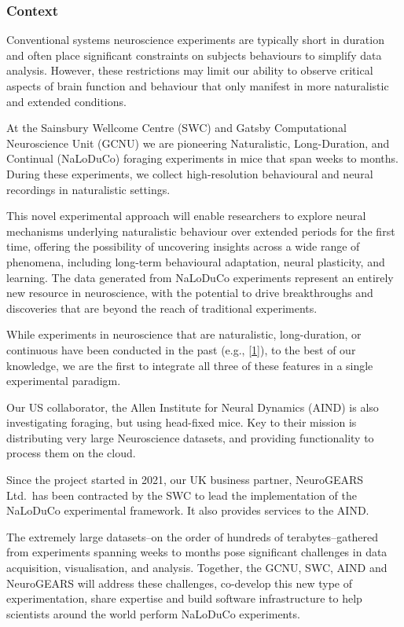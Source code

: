 \subsubsection{Context}

Conventional systems neuroscience experiments are typically short in duration
and often place significant constraints on subjects behaviours to simplify data
analysis.
%
However, these restrictions may limit our ability to observe critical
aspects of brain function and behaviour that only manifest in more naturalistic
and extended conditions.

At the Sainsbury Wellcome Centre (SWC) and Gatsby Computational Neuroscience
Unit (GCNU) we are pioneering Naturalistic, Long-Duration, and Continual
(NaLoDuCo) foraging experiments in mice that span weeks to months. During these
experiments, we collect high-resolution behavioural and neural recordings in
naturalistic settings.

This novel experimental approach will enable researchers to explore neural
mechanisms underlying naturalistic behaviour over extended periods for the first
time, offering the possibility of uncovering insights across a wide range of
phenomena, including long-term behavioural adaptation, neural plasticity, and
learning.
%
The data generated from NaLoDuCo experiments represent an entirely new resource
in neuroscience, with the potential to drive breakthroughs and discoveries that
are beyond the reach of traditional experiments.

While experiments in neuroscience that are naturalistic, long-duration, or
continuous have been conducted in the past
(e.g., [\href{https://pubmed.ncbi.nlm.nih.gov/37656619/}{1}]), to the best of our
knowledge, we are the first to integrate all three of these features in a
single experimental paradigm.

Our US collaborator, the Allen Institute for Neural Dynamics (AIND) is also investigating
foraging, but using head-fixed mice. Key to their mission is distributing very large Neuroscience datasets,
and providing functionality to process them on the cloud.

Since the project started in 2021, our UK business partner, NeuroGEARS Ltd.\ 
has been contracted by the SWC to lead the implementation of the NaLoDuCo
experimental framework. It also provides services to the AIND.

The extremely large datasets--on the order of hundreds of terabytes--gathered
from experiments spanning weeks to months pose significant challenges in data
acquisition, visualisation, and analysis.
%
Together, the GCNU, SWC, AIND and NeuroGEARS will address these challenges,
co-develop this new type of experimentation, share expertise and build software
infrastructure to help scientists around the world perform NaLoDuCo
experiments.

